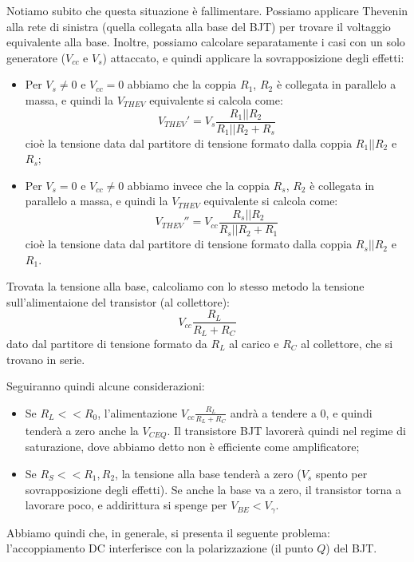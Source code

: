\documentclass[a4paper,11pt]{article}
\begin{document}
Notiamo subito che questa situazione è fallimentare. Possiamo applicare Thevenin alla rete di sinistra (quella collegata alla base del BJT) per trovare il voltaggio equivalente alla base. Inoltre, possiamo calcolare separatamente i casi con un solo generatore ($V_{cc}$ e $V_s$) attaccato, e quindi applicare la sovrapposizione degli effetti:
\begin{itemize}
	\item Per $V_s \neq 0$ e $V_{cc} = 0$ abbiamo che la coppia $R_1$, $R_2$ è collegata in parallelo a massa, e quindi la $V_{THEV}$ equivalente si calcola come:
$$
V_{THEV}' = V_s \frac{R_1 || R_2}{R_1 || R_2 + R_s}
$$
cioè la tensione data dal partitore di tensione formato dalla coppia $R_1 || R_2$ e $R_s$;

	\item Per $V_s = 0$ e $V_{cc} \neq 0$ abbiamo invece che la coppia $R_s$, $R_2$ è collegata in parallelo a massa, e quindi la $V_{THEV}$ equivalente si calcola come:
$$
V_{THEV}'' = V_{cc} \frac{R_s || R_2}{R_s || R_2 + R_1}
$$
cioè la tensione data dal partitore di tensione formato dalla coppia $R_s || R_2$ e $R_1$.

\end{itemize}

Trovata la tensione alla base, calcoliamo con lo stesso metodo la tensione sull'alimentaione del transistor (al collettore):
$$
V_{cc} \frac{R_L}{R_L + R_C}
$$
dato dal partitore di tensione formato da $R_L$ al carico e $R_C$ al collettore, che si trovano in serie.

Seguiranno quindi alcune considerazioni:
\begin{itemize}
	\item Se $R_L << R_0$, l'alimentazione $V_{cc} \frac{R_L}{R_L + R_C}$ andrà a tendere a 0, e quindi tenderà a zero anche la $V_{CEQ}$. Il transistore BJT lavorerà quindi nel regime di saturazione, dove abbiamo detto non è efficiente come amplificatore;
	\item Se $R_S << R_1, R_2$, la tensione alla base tenderà a zero ($V_s$ spento per sovrapposizione degli effetti). Se anche la base va a zero, il transistor torna a lavorare poco, e addirittura si spenge per $V_{BE} < V_\gamma$.
\end{itemize}

Abbiamo quindi che, in generale, si presenta il seguente problema: l’accoppiamento DC interferisce con la polarizzazione (il punto $Q$) del BJT.

\par\smallskip
\end{document}
